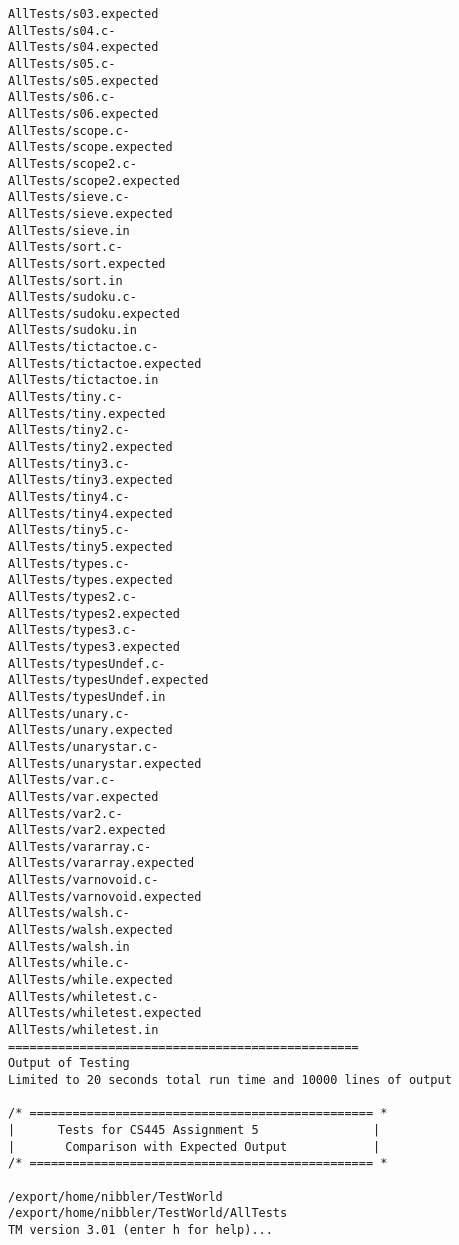 \documentclass[12pt]{book}
\begin{document}
\begin{lstlisting}
AllTests/s03.expected
AllTests/s04.c-
AllTests/s04.expected
AllTests/s05.c-
AllTests/s05.expected
AllTests/s06.c-
AllTests/s06.expected
AllTests/scope.c-
AllTests/scope.expected
AllTests/scope2.c-
AllTests/scope2.expected
AllTests/sieve.c-
AllTests/sieve.expected
AllTests/sieve.in
AllTests/sort.c-
AllTests/sort.expected
AllTests/sort.in
AllTests/sudoku.c-
AllTests/sudoku.expected
AllTests/sudoku.in
AllTests/tictactoe.c-
AllTests/tictactoe.expected
AllTests/tictactoe.in
AllTests/tiny.c-
AllTests/tiny.expected
AllTests/tiny2.c-
AllTests/tiny2.expected
AllTests/tiny3.c-
AllTests/tiny3.expected
AllTests/tiny4.c-
AllTests/tiny4.expected
AllTests/tiny5.c-
AllTests/tiny5.expected
AllTests/types.c-
AllTests/types.expected
AllTests/types2.c-
AllTests/types2.expected
AllTests/types3.c-
AllTests/types3.expected
AllTests/typesUndef.c-
AllTests/typesUndef.expected
AllTests/typesUndef.in
AllTests/unary.c-
AllTests/unary.expected
AllTests/unarystar.c-
AllTests/unarystar.expected
AllTests/var.c-
AllTests/var.expected
AllTests/var2.c-
AllTests/var2.expected
AllTests/vararray.c-
AllTests/vararray.expected
AllTests/varnovoid.c-
AllTests/varnovoid.expected
AllTests/walsh.c-
AllTests/walsh.expected
AllTests/walsh.in
AllTests/while.c-
AllTests/while.expected
AllTests/whiletest.c-
AllTests/whiletest.expected
AllTests/whiletest.in
=================================================
Output of Testing
Limited to 20 seconds total run time and 10000 lines of output

/* ================================================ *
|      Tests for CS445 Assignment 5                |
|       Comparison with Expected Output            |
/* ================================================ *

/export/home/nibbler/TestWorld
/export/home/nibbler/TestWorld/AllTests
TM version 3.01 (enter h for help)...


\end{lstlisting}
\end{document}
